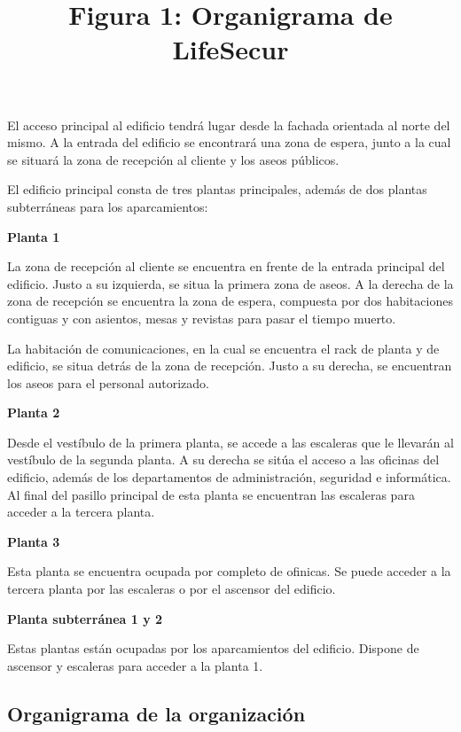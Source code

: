 \documentclass[11pt,bibtotoc,noliststotoc,BCOR0mm]{scrbook}
\begin{document}
El acceso principal al edificio tendrá lugar desde la fachada orientada al norte del mismo. A la entrada del edificio se encontrará una zona de espera, junto a la cual se situará la zona de recepción al cliente y los aseos públicos.

El edificio principal consta de tres plantas principales, además de dos plantas subterráneas para los aparcamientos:

\textbf{Planta 1}

La zona de recepción al cliente se encuentra en frente de la entrada principal del edificio. Justo a su izquierda, se situa la primera zona de aseos. A la derecha de la zona de recepción se encuentra la zona de espera, compuesta por dos habitaciones contiguas y con asientos, mesas y revistas para pasar el tiempo muerto.

La habitación de comunicaciones, en la cual se encuentra el rack de planta y de edificio, se situa detrás de la zona de recepción. Justo a su derecha, se encuentran los aseos para el personal autorizado.

\textbf{Planta 2}

Desde el vestíbulo de la primera planta, se accede a las escaleras que le llevarán al vestíbulo de la segunda planta. A su derecha se sitúa el acceso a las oficinas del edificio, además de los departamentos de administración, seguridad e informática. Al final del pasillo principal de esta planta se encuentran las escaleras para acceder a la tercera planta.

\textbf{Planta 3}

Esta planta se encuentra ocupada por completo de ofinicas. Se puede acceder a la tercera planta por las escaleras o por el ascensor del edificio.

\textbf{Planta subterránea 1 y 2}

Estas plantas están ocupadas por los aparcamientos del edificio. Dispone de ascensor y escaleras para acceder a la planta 1.

\subsection{Organigrama de la organización}

\\
\title{Figura 1: Organigrama de LifeSecur}
\end{document}
